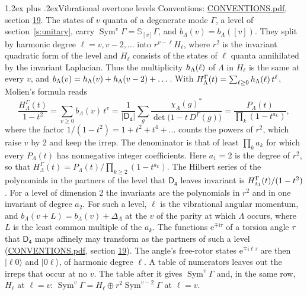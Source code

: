 \documentclass[10pt,a4paper]{article}
\makeatletter
\renewcommand\section{\@startsection{section}{1}{\z@}{-3ex plus -1ex minus -.2ex}%
  {1.2ex plus .2ex}{\normalfont\large\sffamily\bfseries\color{parttitle}}}
\numberwithin{equation}{section}
\newcommand{\grp}[1]{\mathsf{#1}}
\newcommand{\irr}[1]{\text{\normalfont\scshape #1}}
\newcommand{\iunit}{\mathrm{i}}
\newcommand{\expe}{\mathrm{e}}
\newcommand{\repD}[1]{D^{#1}}
\newcommand{\irchar}[1]{\chi_{#1}}
\newcommand{\conj}[1]{{#1}^{*}}
\newcommand{\schur}[1]{\mathbb{S}_{#1}}
\newcommand{\shape}[1]{[#1]}
\newcommand{\occ}[1]{\lvert #1\rangle}
\makeatother
\begin{document}
\section{Vibrational overtone levels}\label{s:overtones}
Conventions: \href{../../CONVENTIONS.pdf}{CONVENTIONS.pdf}, section \href{../../CONVENTIONS.pdf\#conv.19}{19}.
\leavevmode\label{n:index.quanta}\label{n:operator.symmetric.power}The states of $v$ quanta of a degenerate mode $\Gamma$, a level of section~\ref{s:unitary}, carry $\operatorname{Sym}^{v}\Gamma = \schur{\shape{v}}\Gamma$, and $b_\Lambda(v) = b_\Lambda(\shape{v})$. \label{n:local.quadratic.form}\label{n:set.harmonic}They split by harmonic degree $\ell = v, v - 2, \dots$ into $r^{v-\ell}H_\ell$, where $r^2$ is the invariant quadratic form of the level and $H_\ell$ consists of the states of $\ell$ quanta annihilated by the invariant Laplacian. \label{n:function.multiplicity.harmonic}Thus the multiplicity $\mathnormal{h}_\Lambda(\ell)$ of $\Lambda$ in $H_\ell$ is the same at every $v$, and $b_\Lambda(v) = \mathnormal{h}_\Lambda(v) + \mathnormal{h}_\Lambda(v - 2) + \dots$. \label{n:function.generating.level}With $H^{\Gamma}_\Lambda(t) = \sum_{\ell\ge0} \mathnormal{h}_\Lambda(\ell)\,t^{\ell}$, Molien's formula reads
\begin{equation}\label{e:molien}\frac{H^{\Gamma}_\Lambda(t)}{1 - t^2} = \sum_{v\ge0} b_\Lambda(v)\,t^v = \frac{1}{|\grp{D_{4}}|}\sum_{g}\frac{\conj{\irchar{\Lambda}(g)}}{\det\bigl(1 - t\,\repD{\Gamma}(g)\bigr)} = \frac{P_\Lambda(t)}{\prod_k (1-t^{a_k})},\end{equation}
where the factor $1/(1 - t^2) = 1 + t^2 + t^4 + \dots$ counts the powers of $r^2$, which raise $v$ by 2 and keep the irrep. The denominator is that of least $\prod_k a_k$ for which every $P_\Lambda(t)$ has nonnegative integer coefficients. Here $a_1 = 2$ is the degree of $r^2$, so that $H^{\Gamma}_\Lambda(t) = P_\Lambda(t)/\prod_{k\ge2}(1 - t^{a_k})$. The Hilbert series of the polynomials in the partners of the level that $\grp{D_{4}}$ leaves invariant is $H^{\Gamma}_{\irr{a}_{1}}(t)/(1 - t^2)$. For a level of dimension 2 the invariants are the polynomials in $r^2$ and in one invariant of degree $a_2$. \label{n:index.overtone.period}\label{n:index.increment.unitary}For such a level, $\ell$ is the vibrational angular momentum, and $b_\Lambda(v + L) = b_\Lambda(v) + \Delta_\Lambda$ at the $v$ of the parity at which $\Lambda$ occurs, where $L$ is the least common multiple of the $a_k$. \label{n:local.torsion.angle}The functions $\expe^{\mp\iunit\tau}$ of a torsion angle $\tau$ that $\grp{D_{4}}$ maps affinely may transform as the partners of such a level (\href{../../CONVENTIONS.pdf}{CONVENTIONS.pdf}, section \href{../../CONVENTIONS.pdf\#conv.19}{19}). The angle's free-rotor states $\expe^{\mp\iunit\ell\tau}$ are then $\occ{\ell 0}$ and $\occ{0 \ell}$, of harmonic degree $\ell$. A table of numerators leaves out the irreps that occur at no $v$. The table after it gives $\operatorname{Sym}^{v}\Gamma$ and, in the same row, $H_\ell$ at $\ell = v$: $\operatorname{Sym}^{v}\Gamma = H_\ell \oplus r^2\operatorname{Sym}^{v-2}\Gamma$ at $\ell = v$.
\end{document}
